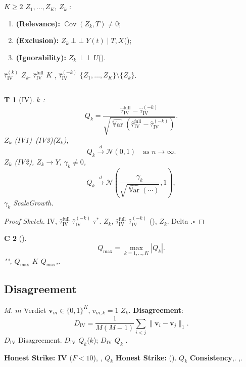 \documentclass[11pt,a4paper,twoside]{article}
\newtheorem{theorem}Theorem[section]
\newtheorem{corollary}[theorem]Corollary
\DeclareMathOperator*{\Var}{\mathbb{V}\mathrm{ar}}
\DeclareMathOperator*{\Cov}{\mathbb{C}\mathrm{ov}}
\DeclareMathOperator{\indep}{\perp\!\!\!\perp}
\begin{document}
\section{}
\subsection{}
 $K \geq 2$ $Z_1, \ldots, Z_K$, $Z_k$ : 
\begin{enumerate}[label=(IV\arabic*)]
 \item \textbf{(Relevance): }
 $\Cov(Z_k, T) \neq 0$; 
 \item \textbf{(Exclusion): }
 $Z_k \indep Y(t) \mid T, X$(); 
 \item \textbf{(Ignorability): }
 $Z_k \indep U$().
\end{enumerate}
 $\hat{\tau}_{\text{IV}}^{(k)}$ $Z_k$.
 $\hat{\tau}_{\text{IV}}^{\text{full}}$ $K$ 
,  $\hat{\tau}_{\text{IV}}^{(-k)}$ 
$\{Z_1, \ldots, Z_K\} \setminus \{Z_k\}$.
\subsection{}
\begin{theorem}[IV]\label{thm:iv}
 $k$ : 
\[
Q_k = \frac{\hat{\tau}_{\text{IV}}^{\text{full}} - \hat{\tau}_{\text{IV}}^{(-k)}}
 {\sqrt{\widehat{\Var}(\hat{\tau}_{\text{IV}}^{\text{full}} - \hat{\tau}_{\text{IV}}^{(-k)})}}.
\]
 $Z_k$ (IV1)--(IV3)($Z_k$), 
\[
Q_k \xrightarrow{d} \mathcal{N}(0, 1) \quad \text{as } n \to \infty.
\]
 $Z_k$ (IV2), $Z_k \to Y$, 
 $\gamma_k \neq 0$, 
\[
Q_k \xrightarrow{d} \mathcal{N}\left(
 \frac{\gamma_k}{\sqrt{\widehat{\Var}(\cdots)}}, 1
\right),
\]
 $\gamma_k$ ScaleGrowth.
\end{theorem}
\begin{proof}[Proof Sketch]
 IV, $\hat{\tau}_{\text{IV}}^{\text{full}}$ 
$\hat{\tau}_{\text{IV}}^{(-k)}$ $\tau^*$.
 $Z_k$, $\hat{\tau}_{\text{IV}}^{\text{full}}$ 
$\hat{\tau}_{\text{IV}}^{(-k)}$ (), 
 $Z_k$. Delta 
.\hfill $\square$
\end{proof}
\begin{corollary}[]
\[
Q_{\max} = \max_{k=1,\ldots,K} |Q_k|.
\]
"", $Q_{\max}$ $K$ 
 $Q_{\max}$,.
\end{corollary}
\subsection{Disagreement}
$M$.
 $m$ Verdict $\bm{v}_m \in \{0,1\}^K$, 
 $v_{m,k} = 1$ $Z_k$.
\textbf{Disagreement}: 
\[
D_{\text{IV}} = \frac{1}{M(M-1)}\sum_{i<j} \|\bm{v}_i - \bm{v}_j\|_1.
\]
$D_{\text{IV}}$ Disagreement.
 $D_{\text{IV}}$ $Q_k$($k$); 
 $D_{\text{IV}}$ $Q_k$ 
.
\begin{honestbox}
\textbf{Honest Strike: IV} ($F < 10$), 
, $Q_k$ 
\textbf{Honest Strike: } ().
$Q_k$ \textbf{Consistency},.
,.
\end{honestbox}
\end{document}
